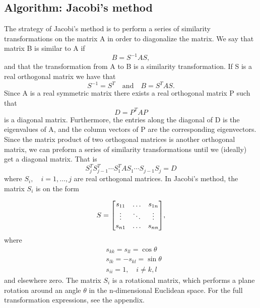 \subsection{Algorithm: Jacobi's method}
\label{sec:jacobi}
The strategy of Jacobi's method is to perform a series of similarity transformations on the matrix A in order to diagonalize the matrix. We say that matrix B is similar to A if
 \begin{equation}
	B = S^{-1}AS, 
 \end{equation}
and that the transformation from A to B is a similarity transformation. If S is a real orthogonal matrix we have that 
 \begin{equation}\label{eq:sim}
	 S^{-1}=S^T \quad \text{and} \quad B = S^TAS.
 \end{equation}
Since A is a real symmetric matrix there exists a real orthogonal matrix P such that 
 \begin{equation}
     D=P^TAP
 \end{equation}
is a diagonal matrix. Furthermore, the entries along the diagonal of D is the eigenvalues of A, and the column vectors of P are the corresponding eigenvectors. Since the matrix product of two orthogonal matrices is another orthogonal matrix, we can preform a series of similarity transformations until we (ideally) get a diagonal matrix. That is 
\begin{equation}
S_j^TS_{j-1}^T\cdots S_1^TAS_1 \cdots S_{j-1}S_j = D
\end{equation}
where $S_i, \quad i = 1, \ldots, j $ are real orthogonal matrices. In Jacobi's method, the matrix $S_i$ is on the form

\begin{equation}\label{eq:S}
S =
\mqty[s_{11} & \hdots & s_{1n} \\
\vdots & \ddots & \vdots \\
s_{n1} & \hdots & s_{nn} ],
\end{equation}
where 
\begin{equation}
\begin{split}
&s_{kk}=s_{ll} = \cos \theta \\
&s_{lk} = -s_{kl} = \sin \theta \\
&s_{ii} =  1, \quad i \neq k,l 
\end{split}
\end{equation}
and elsewhere zero. The matrix $S_i$ is a rotational matrix, which performs a plane rotation around an angle $\theta$ in the n-dimensional Euclidean space. For the full transformation expressions, see the appendix.

